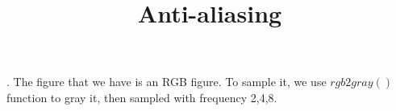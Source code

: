 \documentclass[12pt,a4paper]{article}
\title{Anti-aliasing}
\date{}
\author{}
\begin{document}
. The figure that we have is an RGB figure. To sample it, we use $rgb2gray()$ function to gray it, then sampled with
frequency 2,4,8.
\begin{figure}[H]
    \centering  %

\end{figure}
\end{document}
